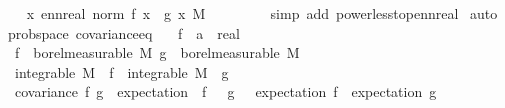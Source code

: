 \begin{isabellebody}
\ \ \isamarkupfalse%
\ {\isachardoublequoteopen}{\isacharparenleft}{\kern0pt}{\isasymintegral}\isactrlsup {\isacharplus}{\kern0pt}\ x{\isachardot}{\kern0pt}\ ennreal\ {\isacharparenleft}{\kern0pt}norm\ {\isacharparenleft}{\kern0pt}f\ x\ {\isacharasterisk}{\kern0pt}\ g\ x{\isacharparenright}{\kern0pt}{\isacharparenright}{\kern0pt}\ {\isasympartial}M{\isacharparenright}{\kern0pt}\ {\isacharless}{\kern0pt}\ {\isasyminfinity}{\isachardoublequoteclose}\ \isanewline
\ \ \ \ \isamarkupfalse%
\ {\isacharparenleft}{\kern0pt}simp\ add{\isacharcolon}{\kern0pt}\ power{\isacharunderscore}{\kern0pt}less{\isacharunderscore}{\kern0pt}top{\isacharunderscore}{\kern0pt}ennreal{\isacharparenright}{\kern0pt}\isanewline
{}\isamarkupfalse%
\ auto%
\endisatagproof
{\isafoldproof}%
%
\isadelimproof
\isanewline
%
\endisadelimproof
\isanewline
{}\isamarkupfalse%
\ {\isacharparenleft}{\kern0pt}\ prob{\isacharunderscore}{\kern0pt}space{\isacharparenright}{\kern0pt}\ covariance{\isacharunderscore}{\kern0pt}eq{\isacharcolon}{\kern0pt}\isanewline
\ \ \ f\ {\isacharcolon}{\kern0pt}{\isacharcolon}{\kern0pt}\ {\isachardoublequoteopen}{\isacharprime}{\kern0pt}a\ {\isasymRightarrow}\ real{\isachardoublequoteclose}\isanewline
\ \ \ {\isachardoublequoteopen}f\ {\isasymin}\ borel{\isacharunderscore}{\kern0pt}measurable\ M{\isachardoublequoteclose}\ {\isachardoublequoteopen}g\ {\isasymin}\ borel{\isacharunderscore}{\kern0pt}measurable\ M{\isachardoublequoteclose}\isanewline
\ \ \ {\isachardoublequoteopen}integrable\ M\ {\isacharparenleft}{\kern0pt}{\isasymlambda}{\isasymomega}{\isachardot}{\kern0pt}\ f\ {\isasymomega}{\isacharcircum}{\kern0pt}{}{\isacharparenright}{\kern0pt}{\isachardoublequoteclose}\ {\isachardoublequoteopen}integrable\ M\ {\isacharparenleft}{\kern0pt}{\isasymlambda}{\isasymomega}{\isachardot}{\kern0pt}\ g\ {\isasymomega}{\isacharcircum}{\kern0pt}{}{\isacharparenright}{\kern0pt}{\isachardoublequoteclose}\isanewline
\ \ \ {\isachardoublequoteopen}covariance\ f\ g\ {\isacharequal}{\kern0pt}\ expectation\ {\isacharparenleft}{\kern0pt}{\isasymlambda}{\isasymomega}{\isachardot}{\kern0pt}\ f\ {\isasymomega}\ {\isacharasterisk}{\kern0pt}\ g\ {\isasymomega}{\isacharparenright}{\kern0pt}\ {\isacharminus}{\kern0pt}\ expectation\ f\ {\isacharasterisk}{\kern0pt}\ expectation\ g{\isachardoublequoteclose}\isanewline
%
\isadelimproof
%
\endisadelimproof
%
\isatagproof
{}\isamarkupfalse%
\ {\isacharminus}{\kern0pt}\isanewline

\end{isabellebody}
